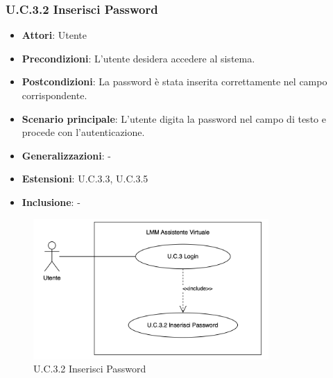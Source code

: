\subsubsection{U.C.3.2 Inserisci Password}
\begin{itemize}
    \item \textbf{Attori}: Utente
    \item \textbf{Precondizioni}: L'utente desidera accedere al sistema.  
    \item \textbf{Postcondizioni}: La password è stata inserita correttamente nel campo corrispondente.
    \item \textbf{Scenario principale}: L'utente digita la password nel campo di testo e procede con l'autenticazione.
    \item \textbf{Generalizzazioni}: -
    \item \textbf{Estensioni}: U.C.3.3, U.C.3.5
    \item \textbf{Inclusione}: -
\end{itemize}
\begin{figure}[H]
    \centering
    \includegraphics[width=0.8\textwidth]{img/U.C.3.2.png}
    \caption{U.C.3.2 Inserisci Password}
\end{figure}
\newpage %

